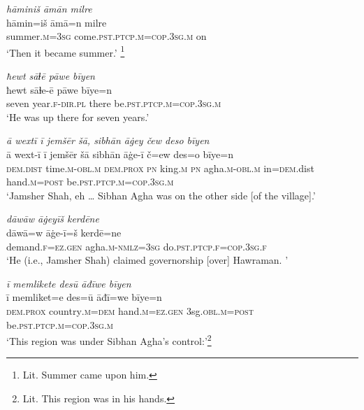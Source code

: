 \ea \label{DP.10}
\textit{hāminiš āmān milre} \\ 
\gll hāmin=iš āmā=n milre \\ 
 summer\textsc{.m}\textsc{=3sg} come\textsc{.pst}\textsc{.ptcp}\textsc{.m}\textsc{=cop}\textsc{.3sg}\textsc{.m} on \\ 
\glt `Then it became summer.' \footnote{Lit. Summer came upon him.}
\z 
 
\ea \label{DP.11}
\textit{ħewt sāɫē pāwe bīyen} \\ 
\gll ħewt sāɫe-ē pāwe bīye=n \\ 
 seven year\textsc{\textsc{.f}}\textsc{-dir}\textsc{.pl} there be\textsc{.pst}\textsc{.ptcp}\textsc{.m}\textsc{=cop}\textsc{.3sg}\textsc{.m} \\ 
\glt `He was up there for seven years.'
\z 
 
\ea \label{DP.12}
\textit{ā wextī ī jemšēr šā, sibhān āġey čew deso bīyen} \\ 
\gll ā wext-ī ī jemšēr šā sibhān āġe-ī č=ew des=o bīye=n \\ 
 \textsc{dem.dist} time\textsc{.m}\textsc{-obl}\textsc{.m} \textsc{dem.prox} \textsc{pn} king\textsc{.m} \textsc{pn} agha\textsc{.m}\textsc{-obl}\textsc{.m} in\textsc{=dem}.dist hand\textsc{.m}\textsc{=\textsc{post}} be\textsc{.pst}\textsc{.ptcp}\textsc{.m}\textsc{=cop}\textsc{.3sg}\textsc{.m} \\ 
\glt `Jamsher Shah, eh … Sibhan Agha was on the other side [of the village].'
\z 
 
\ea \label{DP.13}
\textit{dāwāw āġeyīš kerdēne} \\ 
\gll dāwā=w āġe-ī=š kerdē=ne \\ 
 demand\textsc{\textsc{.f}}\textsc{=ez}\textsc{.gen} agha\textsc{.m}\textsc{-nmlz}\textsc{=3sg} do\textsc{.pst}\textsc{.ptcp}\textsc{\textsc{.f}}\textsc{=cop}\textsc{.3sg}\textsc{\textsc{.f}} \\ 
\glt `He (i.e., Jamsher Shah) claimed governorship [over] Hawraman. '
\z 
 
\ea \label{DP.14}
\textit{ī memlikete desū āđīwe bīyen} \\ 
\gll ī memliket=e des=ū āđī=we bīye=n \\ 
 \textsc{dem.prox} country\textsc{.m}\textsc{=dem} hand\textsc{.m}\textsc{=ez}\textsc{.gen} 3sg\textsc{.obl}\textsc{.m}\textsc{=\textsc{post}} be\textsc{.pst}\textsc{.ptcp}\textsc{.m}\textsc{=cop}\textsc{.3sg}\textsc{.m} \\ 
\glt `This region was under Sibhan Agha’s control:'\footnote{Lit. This region was in his hands.}
\z 
 
